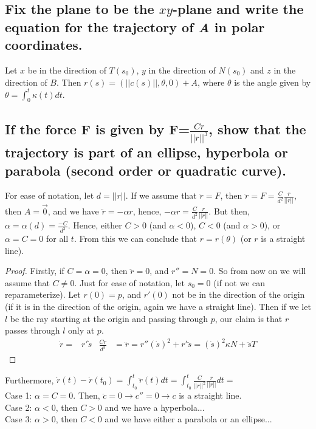 \documentclass[12pt]{amsart}
\begin{document}
\subsection{Fix the plane to be the $xy$-plane and write the equation for the trajectory of \emph{A} in polar coordinates.}
Let $x$ be in the direction of $T(s_0)$, $y$ in the direction of $N(s_0)$ and $z$ in the direction of $B$. Then $r(s)=(||c(s)||,\theta,0)+A$, where $\theta$ is the angle given by $\theta=\int_0^t\kappa(t)dt$.

\subsection{If the force \textbf{F} is given by \textbf{F}=$\frac{Cr}{||r||^3}$, show that the trajectory is part of an ellipse, hyperbola or parabola (second order or quadratic curve).}
For ease of notation, let $d=||r||$. If we assume that $\ddot r=F$, then $\ddot r=F=\frac{C}{d^2}\frac{r}{||r||}$, then $A=\vec0$, and we have $\ddot r=-\alpha r$, hence, $-\alpha r=\frac{C}{d^2}\frac{r}{||r||}$. But then, $\alpha=\alpha(d)=\frac{-C}{d^3}$. Hence, either $C>0$ (and $\alpha<0$), $C<0$ (and $\alpha>0$), or $\alpha=C=0$ for all $t$. From this we can conclude that $r=r(\theta)$ (or $r$ is a straight line).
\begin{proof}
	Firstly, if $C=\alpha=0$, then $\ddot r=0$, and $r''=N=0$. So from now on we will assume that $C\neq0$. Just for ease of notation, let $s_0=0$ (if not we can reparameterize). Let $r(0)=p$, and $r'(0)$ not be in the direction of the origin (if it is in the direction of the origin, again we have a straight line). Then if we let $l$ be the ray starting at the origin and passing through $p$, our claim is that $r$ passes through $l$ only at $p$.
	\begin{align*}
		\dot r=& r'\dot s & \frac{Cr}{d^3}&=\ddot r=r''(\dot s)^2+r'\ddot s=(\dot s)^2\kappa N+\ddot s T
	\end{align*}
\end{proof}
Furthermore, $\dot r(t)-\dot r(t_0)=\int_{t_0}^t\ddot r(t)dt=\int_{t_0}^t\frac{C}{||r||^2}\frac{r}{||r||}dt=$
\\Case 1: $\alpha=C=0$. Then, $\ddot c=0\rightarrow c''=0\rightarrow c$ is a straight line.
\\Case 2: $\alpha<0$, then $C>0$ and we have a hyperbola...
\\Case 3: $\alpha>0$, then $C<0$ and we have either a parabola or an ellipse...

\setcounter{equation}{0}
\newpage%
\end{document}
